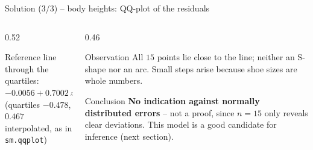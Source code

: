 \documentclass[aspectratio=169,11pt]{beamer}
\begin{document}
\begin{frame}{Solution (3/3) -- body heights: QQ-plot of the residuals}
  \begin{columns}[T]
    \begin{column}{0.52\textwidth}
      \begin{center}\footnotesize
        Reference line through the quartiles: $-0.0056 + 0.7002\,z$\\
        (quartiles $-0.478$, $0.467$ interpolated, as in \texttt{sm.qqplot})
      \end{center}
    \end{column}
    \begin{column}{0.46\textwidth}
      \small
      \begin{block}{Observation}
        All $15$ points lie close to the line; neither an S-shape nor an arc.
        Small steps arise because shoe sizes are whole numbers.
      \end{block}
      \begin{exampleblock}{Conclusion}
        \textbf{No indication against normally distributed errors} -- not a
        proof, since $n = 15$ only reveals clear deviations. This model is a
        good candidate for inference (next section).
      \end{exampleblock}
    \end{column}
  \end{columns}
\end{frame}
\end{document}

